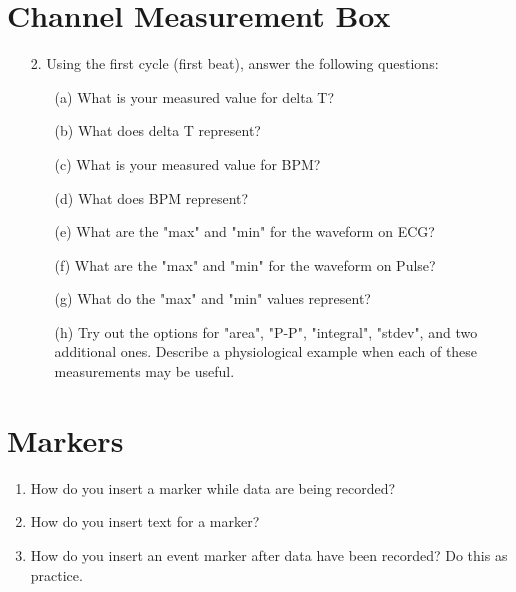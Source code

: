 \documentclass{article}
\begin{document}
\section*{Channel Measurement Box}
\begin{itemize}		
	\item[2.] Using the first cycle (first beat), answer the following questions:
		\begin{itemize}
			\item[(a)] What is your measured value for delta T?\vspace{1cm}
			\item[(b)] What does delta T represent?\vspace{1cm}
			\item[(c)] What is your measured value for BPM?\vspace{1cm}
			\item[(d)] What does BPM represent?\vspace{1cm}
			\item[(e)] What are the "max" and "min" for the waveform on ECG?\vspace{1cm}
			\item[(f)] What are the "max" and "min" for the waveform on Pulse?\vspace{1cm}
			\item[(g)] What do the "max" and "min" values represent?\vspace{2cm}
			\item[(h)] Try out the options for "area", "P-P", "integral", "stdev", and two additional ones. Describe a physiological example when each of these measurements may be useful.\vspace{9cm}
		\end{itemize}
\end{itemize}

\section*{Markers}
\begin{enumerate}
	\item How do you insert a marker while data are being recorded?\vspace{1.5cm}
	\item How do you insert text for a marker?\vspace{1.5cm}
	\item How do you insert an event marker after data have been recorded? Do this as practice.\vspace{2cm}
\end{enumerate}
\end{document}
